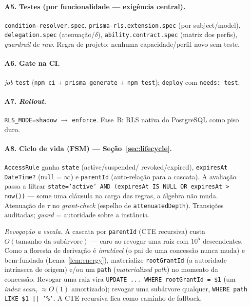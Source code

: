 \documentclass[11pt,a4paper]{article}
\theoremstyle{definition}
\newcommand{\dep}{\delta}
\begin{document}
\paragraph{A5. Testes (por funcionalidade --- exigência central).}
\texttt{condition-resolver.spec}, \texttt{prisma-rls.extension.spec} (por
subject/model), \texttt{delegation.spec} (atenuação/$\dep$),
\texttt{ability.contract.spec} (matriz dos perfis), \emph{guardrail} de
\emph{raw}. Regra de projeto: nenhuma capacidade/perfil novo sem teste.

\paragraph{A6. Gate na CI.}
\emph{job} \texttt{test} (\texttt{npm ci} + \texttt{prisma generate} +
\texttt{npm test}); \texttt{deploy} com \texttt{needs: test}.

\paragraph{A7. \emph{Rollout}.}
\texttt{RLS\_MODE=shadow} $\to$ \texttt{enforce}. Fase~B: RLS nativa do
PostgreSQL como piso duro.

\paragraph{A8. Ciclo de vida (FSM) --- Seção~\ref{sec:lifecycle}.}
\texttt{AccessRule} ganha \texttt{state} (\textsf{active}/\textsf{suspended}/
\textsf{revoked}/\textsf{expired}), \texttt{expiresAt DateTime?}
(\texttt{null}$=\infty$) e \texttt{parentId} (auto-relação para a cascata).
A avaliação passa a filtrar \texttt{state='active' AND (expiresAt IS NULL OR
expiresAt > now())} --- some uma cláusula na carga das regras, a álgebra não
muda. Atenuação de $\tau$ no \emph{grant-check} (espelho de
\texttt{attenuatedDepth}). Transições auditadas; \emph{guard} = autoridade
sobre a instância.

\emph{Revogação a escala.} A cascata por \texttt{parentId} (CTE recursiva)
custa $O(\text{tamanho da subárvore})$ --- caro ao revogar uma raiz com
$10^5$ descendentes. Como a floresta de derivação é \emph{imutável} (o pai de
uma concessão nunca muda) e bem-fundada (Lema~\ref{lem:energy}), materialize
\texttt{rootGrantId} (a autoridade intrínseca de origem) e/ou um
\texttt{path} (\emph{materialized path}) no momento da concessão. Revogar uma
raiz vira \texttt{UPDATE ... WHERE rootGrantId = \$1} (um \emph{index scan},
$\approx O(1)$ amortizado); revogar uma subárvore qualquer,
\texttt{WHERE path LIKE \$1 || '\%'}. A CTE recursiva fica como caminho de
fallback.
\end{document}

